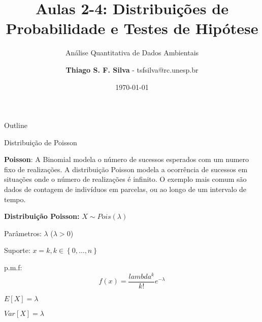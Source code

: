 \documentclass{beamer}
\title{Aulas 2-4: Distribuições de Probabilidade e Testes de Hipótese}
\subtitle{Análise Quantitativa de Dados Ambientais}
\author{\textbf{Thiago S. F. Silva} - tsfsilva@rc.unesp.br}
\institute{Programa de Pós Graduação em Geografia - IGCE/UNESP}
\date{\today}
\begin{document}



\begin{frame}[plain] %
  \titlepage
\end{frame}

\begin{frame}{Outline}
  \tableofcontents
\end{frame}




\begin{frame}{Distribuição de Poisson}

\small{\textbf{Poisson}: A Binomial modela o número de sucessos esperados com um numero fixo de realizações. A distribuição Poisson modela a ocorrência de sucessos em situações onde o número de realizações é infinito. O exemplo mais comum são dados de contagem de indivíduos em parcelas, ou ao longo de um intervalo de tempo}. 

\vfill

\textbf{Distribuição Poisson:} $X \sim Pois(\lambda)$ 
  
Parâmetros: $\lambda$ ($\lambda > 0$)

Suporte: $x = k, k \in \left\{0,\ldots,n\right\}$

p.m.f:
  \begin{equation*}
    f(x) = \frac{lambda^k}{k!} e^{-\lambda}
  \end{equation*}

$E[X] = \lambda$

$Var[X] = \lambda$

\end{frame} 
\end{document}
